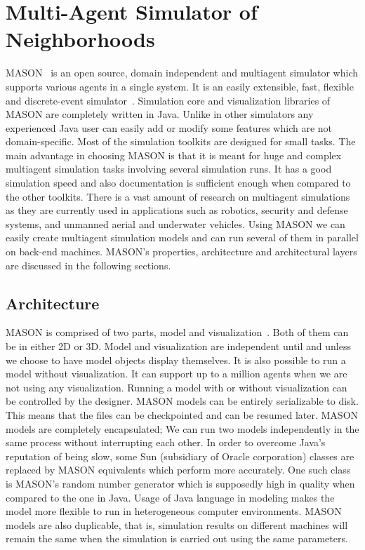 \chapter{Multi-Agent Simulator of Neighborhoods}
\label{Chapter.four}

MASON~\cite{MASON, MASON2005, MASONMANUAL2011} is an open source, domain independent and multiagent simulator which supports various agents in a single system. It is an easily extensible, fast, flexible and discrete-event simulator~\cite{MASON2005}. Simulation core and visualization libraries of MASON are completely written in Java. Unlike in other simulators any experienced Java user can easily add or modify some features which are not domain-specific. Most of the simulation toolkits are designed for small tasks. The main advantage in choosing MASON is that it is meant for huge and complex multiagent simulation tasks involving several simulation runs. It has a good simulation speed and also documentation is sufficient enough when compared to the other toolkits. There is a vast amount of research on multiagent simulations as they are currently used in applications such as robotics, security and defense systems, and unmanned aerial and underwater vehicles. Using MASON we can easily create multiagent simulation models and can run several of them in parallel on back-end machines. MASON's properties, architecture and architectural layers are discussed in the following sections.

\section{Architecture}

MASON is comprised of two parts, model and visualization~\cite{MASONMANUAL2011}. Both of them can be in either 2D or 3D. Model and visualization are independent until and unless we choose to have model objects display themselves. It is also possible to run a model without visualization. It can support up to a million agents when we are not using any visualization. Running a model with or without visualization can be controlled by the designer. MASON models can be entirely serializable to disk. This means that the files can be checkpointed and can be resumed later. MASON models are completely encapsulated; We can run two models independently in the same process without interrupting each other. In order to overcome Java's reputation of being slow, some Sun (subsidiary of Oracle corporation) classes are replaced by MASON equivalents which perform more accurately. One such class is MASON's random number generator which is supposedly high in quality when compared to the one in Java. Usage of Java language in modeling makes the model more flexible to run in heterogeneous computer environments. MASON models are also duplicable, that is, simulation results on different machines will remain the same when the simulation is carried out using the same parameters. 

